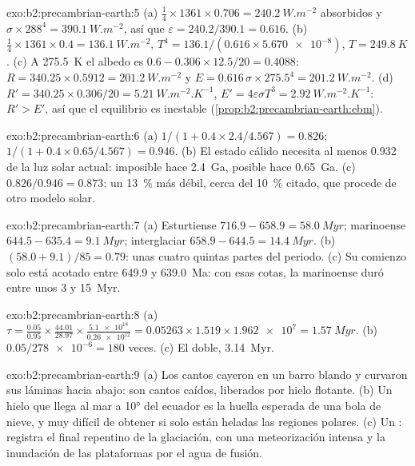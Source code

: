 \begin{solution}{exo:b2:precambrian-earth:5}
(a) $\tfrac14\times1361\times0.706 = \qty{240.2}{W.m^{-2}}$ absorbidos y $\sigma\times288^4 =
\qty{390.1}{W.m^{-2}}$, así que $\varepsilon = 240.2/390.1 = 0.616$. (b) $\tfrac14\times1361\times0.4
= \qty{136.1}{W.m^{-2}}$, $T^4 = 136.1/(0.616\times\num{5.670e-8})$, $T = \qty{249.8}{K}$.
(c) A \qty{275.5}{K} el albedo es $0.6 - 0.306\times12.5/20 = 0.4088$: $R = 340.25\times0.5912 =
\qty{201.2}{W.m^{-2}}$ y $E = 0.616\,\sigma\times275.5^4 = \qty{201.2}{W.m^{-2}}$. (d) $R' =
340.25\times0.306/20 = \qty{5.21}{W.m^{-2}.K^{-1}}$, $E' = 4\varepsilon\sigma T^3 =
\qty{2.92}{W.m^{-2}.K^{-1}}$: $R' > E'$, así que el equilibrio es inestable
(\cref{prop:b2:precambrian-earth:ebm}).
\end{solution}

\begin{solution}{exo:b2:precambrian-earth:6}
(a) $1/(1 + 0.4\times2.4/4.567) = 0.826$; $1/(1 + 0.4\times0.65/4.567) = 0.946$. (b) El estado
cálido necesita al menos 0.932 de la luz solar actual: imposible hace \qty{2.4}{Ga}, posible
hace \qty{0.65}{Ga}. (c) $0.826/0.946 = 0.873$: un \qty{13}{\percent} más débil, cerca del
\qty{10}{\percent} citado, que procede de otro modelo solar.
\end{solution}

\begin{solution}{exo:b2:precambrian-earth:7}
(a) Esturtiense $716.9 - 658.9 = \qty{58.0}{Myr}$; marinoense $644.5 - 635.4 = \qty{9.1}{Myr}$;
interglaciar $658.9 - 644.5 = \qty{14.4}{Myr}$. (b) $(58.0 + 9.1)/85 = 0.79$: unas cuatro quintas partes
del periodo. (c) Su comienzo solo está acotado entre 649.9 y \qty{639.0}{Ma}: con esas
cotas, la marinoense duró entre unos 3 y \qty{15}{Myr}.
\end{solution}

\begin{solution}{exo:b2:precambrian-earth:8}
(a) $\tau = \frac{0.05}{0.95}\times\frac{44.01}{28.97}\times\frac{\num{5.1e18}}{\num{0.26e12}} =
0.05263\times1.519\times\num{1.962e7} = \qty{1.57}{Myr}$. (b) $0.05/\num{278e-6} = 180$ veces.
(c) El doble, \qty{3.14}{Myr}.
\end{solution}

\begin{solution}{exo:b2:precambrian-earth:9}
(a) Los cantos cayeron en un barro blando y curvaron sus láminas hacia abajo: son cantos caídos, liberados por
hielo flotante. (b) Un hielo que llega al mar a \ang{10} del ecuador es la huella esperada de una
bola de nieve, y muy difícil de obtener si solo están heladas las regiones polares. (c) Un :
registra el final repentino de la glaciación, con una meteorización intensa y la inundación de las
plataformas por el agua de fusión.
\end{solution}

